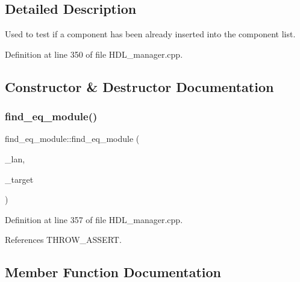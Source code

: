 \subsection{Detailed Description}
Used to test if a component has been already inserted into the component list. 

Definition at line 350 of file H\+D\+L\+\_\+manager.\+cpp.



\subsection{Constructor \& Destructor Documentation}
\mbox{\label{structfind__eq__module_a0f99234d2d9112b2f4e4b2e2d714b91d}} 
\subsubsection{\texorpdfstring{find\+\_\+eq\+\_\+module()}{find\_eq\_module()}}
{\footnotesize\ttfamily find\+\_\+eq\+\_\+module\+::find\+\_\+eq\+\_\+module (\begin{DoxyParamCaption}\item[{const \hyperlink{classlanguage__writer}{language\+\_\+writer} $\ast$}]{\+\_\+lan,  }\item[{const \hyperlink{structural__objects_8hpp_a8ea5f8cc50ab8f4c31e2751074ff60b2}{structural\+\_\+object\+Ref} \&}]{\+\_\+target }\end{DoxyParamCaption})\hspace{0.3cm}{\ttfamily [inline]}}



Definition at line 357 of file H\+D\+L\+\_\+manager.\+cpp.



References T\+H\+R\+O\+W\+\_\+\+A\+S\+S\+E\+RT.



\subsection{Member Function Documentation}
\mbox{\label{structfind__eq__module_abdafce23f99ade320f9b7d5e20924732}} 
